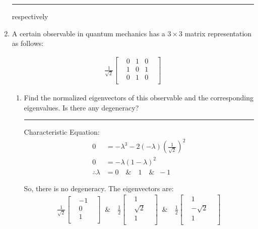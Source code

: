 \documentclass[12pt, oneside]{article}
\newenvironment{answer}
  {\vspace*{0.2cm} \rule{12cm}{0.02cm} \vspace*{0.2cm}}
  {\vspace*{0.2cm}}
\begin{document}
\begin{enumerate}
\begin{answer}
      respectively

    \end{answer}

    \item A certain observable in quantum mechanics has a $3 \times 3$ matrix representation as follows:

    \begin{align*}
      \frac{1}{\sqrt{2}}\begin{bmatrix}
                          & 0 & 1 & 0 & \\
                          & 1 & 0 & 1 & \\
                          & 0 & 1 & 0 & \\
                        \end{bmatrix}
    \end{align*}

    \begin{enumerate}
      \item Find the normalized eigenvectors of this observable and the corresponding eigenvalues. Is there any degeneracy?

      \begin{answer}
        Characteristic Equation:
        \begin{align*}
          0 &= -\lambda^3 -2(-\lambda)(\frac{1}{\sqrt{2}})^2\\
          0 &= -\lambda(1-\lambda)^2 \\
          \therefore \lambda &= 0 \quad \& \quad 1 \quad \& \; \; -1
        \end{align*}

        So, there is no degeneracy. The eigenvectors are:
        \begin{align*}
          \frac{1}{\sqrt{2}}\begin{bmatrix}
                              & -1 & \\
                              & 0  & \\
                              & 1  & \\
                            \end{bmatrix}
                            \; \; \& \quad
          \frac{1}{2}\begin{bmatrix}
                              & 1 & \\
                              & \sqrt{2}  & \\
                              & 1  & \\
                            \end{bmatrix}
                            \; \; \& \quad
          \frac{1}{2}\begin{bmatrix}
                              & 1 & \\
                              & -\sqrt{2}  & \\
                              & 1  & \\
                            \end{bmatrix}
        \end{align*}


\end{answer}
\end{enumerate}
\end{enumerate}
\end{document}
